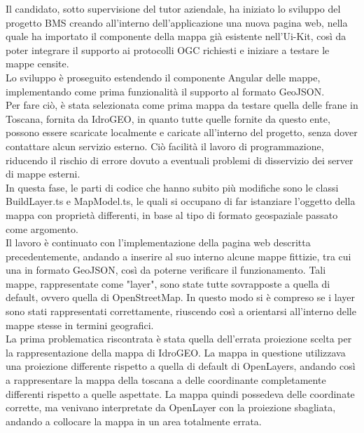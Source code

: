 Il candidato, sotto supervisione del tutor aziendale, ha iniziato lo sviluppo del progetto BMS creando all'interno dell'applicazione una nuova pagina web, nella quale ha importato il componente della mappa già esistente nell'Ui-Kit, così da poter integrare il supporto ai protocolli OGC richiesti e iniziare a testare le mappe censite.
\\Lo sviluppo è proseguito estendendo il componente Angular delle mappe, implementando come prima funzionalità il supporto al formato GeoJSON.
\\Per fare ciò, è stata selezionata come prima mappa da testare quella delle frane in Toscana, fornita da IdroGEO, in quanto tutte quelle fornite da questo ente, possono essere scaricate localmente e caricate all'interno del progetto, senza dover contattare alcun servizio esterno. Ciò facilità il lavoro di programmazione, riducendo il rischio di errore dovuto a eventuali problemi di disservizio dei server di mappe esterni.
\\In questa fase, le parti di codice che hanno subito più modifiche sono le classi BuildLayer.ts e MapModel.ts, le quali si occupano di far istanziare l'oggetto della mappa con proprietà differenti, in base al tipo di formato geospaziale passato come argomento.
\\Il lavoro è continuato con l'implementazione della pagina web descritta precedentemente, andando a inserire al suo interno alcune mappe fittizie, tra cui una in formato GeoJSON, così da poterne verificare il funzionamento. Tali mappe, rappresentate come "layer", sono state tutte sovrapposte a quella di default, ovvero quella di OpenStreetMap. In questo modo si è compreso se i layer sono stati rappresentati correttamente, riuscendo così a orientarsi all'interno delle mappe stesse in termini geografici.
\\La prima problematica riscontrata è stata quella dell'errata proiezione scelta per la rappresentazione della mappa di IdroGEO. La mappa in questione utilizzava una proiezione differente rispetto a quella di default di OpenLayers, andando così a rappresentare la mappa della toscana a delle coordinante completamente differenti rispetto a quelle aspettate. La mappa quindi possedeva delle coordinate corrette, ma venivano interpretate da OpenLayer con la proiezione sbagliata, andando a collocare la mappa in un area totalmente errata.



